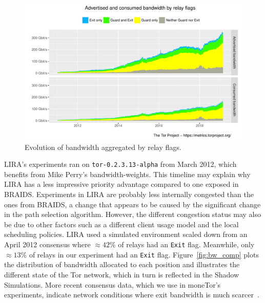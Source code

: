 \begin{figure}
  \includegraphics[scale=0.415]{images/bandwidth-flags-2011-01-01-2019-02-25.pdf}
  \caption{Evolution of bandwidth aggregated by relay flags.}
  \label{fig:bw_inequalities}
\end{figure}

LIRA's experiments ran on \texttt{tor-0.2.3.13-alpha} from March 2012, which benefits from Mike Perry's bandwidth-weights.
This timeline may explain why LIRA has a less impressive priority advantage compared to one exposed in BRAIDS.
Experiments in LIRA are probably less internally congested than the ones from BRAIDS, a change that appears to be caused by the significant change in the path selection algorithm.
However, the different congestion status may also be due to other factors such as a different client usage model and the local scheduling policies.
LIRA used a simulated environment scaled down from an April 2012 consensus where $\approx 42\%$ of relays had an \texttt{Exit} flag.
Meanwhile, only $\approx 13\%$ of relays in our experiment had an \texttt{Exit} flag.
Figure~\ref{fig:bw_comp} plots the distribution of bandwidth allocated to each position and illustrates the different state of the Tor network, which in turn is reflected in the Shadow Simulations.
More recent consensus data, which we use in moneTor's experiments, indicate network conditions where exit bandwidth is much scarcer~\cite{waterfilling-pets2017}.


